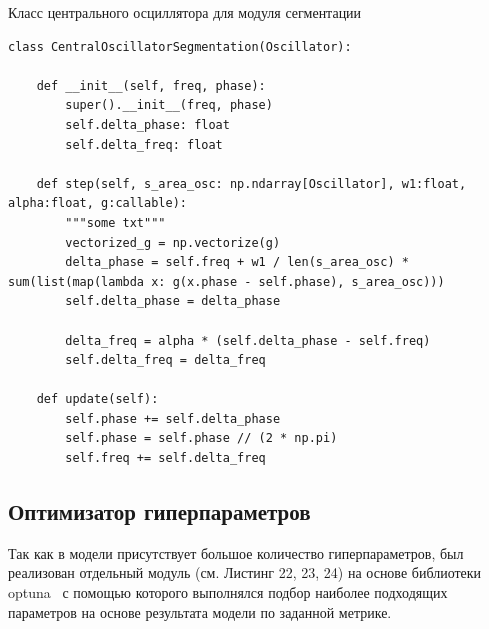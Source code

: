\documentclass[14pt, russian]{scrartcl}
\begin{document}
\begin{listing}[!htt]
    \caption{Класс центрального осциллятора для модуля сегментации}
    \label{lst:contour_extr_sobel}
    \begin{verbatim}
class CentralOscillatorSegmentation(Oscillator):

    def __init__(self, freq, phase):
        super().__init__(freq, phase)
        self.delta_phase: float
        self.delta_freq: float

    def step(self, s_area_osc: np.ndarray[Oscillator], w1:float, alpha:float, g:callable):
        """some txt"""
        vectorized_g = np.vectorize(g)
        delta_phase = self.freq + w1 / len(s_area_osc) * sum(list(map(lambda x: g(x.phase - self.phase), s_area_osc)))
        self.delta_phase = delta_phase

        delta_freq = alpha * (self.delta_phase - self.freq)
        self.delta_freq = delta_freq

    def update(self):
        self.phase += self.delta_phase
        self.phase = self.phase // (2 * np.pi)
        self.freq += self.delta_freq
    \end{verbatim}
\end{listing}

\subsection{Оптимизатор гиперпараметров}

Так как в модели присутствует большое количество гиперпараметров, был реализован отдельный модуль (см. Листинг 22, 23, 24) на основе библиотеки optuna~\cite{2} с помощью которого
выполнялся подбор наиболее подходящих параметров на основе результата модели по заданной метрике.
\end{document}
